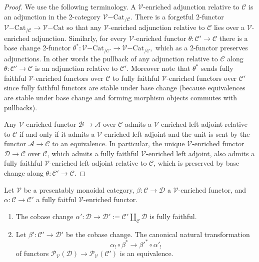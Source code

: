 \documentclass[10pt,oneside]{article}
\numberwithin{equation}{section} %
\numberwithin{figure}{section} %
\theoremstyle{plain}
\theoremstyle{definition}
\newcommand{\mA}{{\mathcal A}}
\newcommand{\mB}{{\mathcal B}}
\newcommand{\mC}{{\mathcal C}}
\newcommand{\mD}{{\mathcal D}}
\newcommand{\mP}{{\mathcal P}}
\newcommand{\mV}{{\mathcal V}}
\newcommand{\Cat}{\mathrm{Cat}}
\begin{document}
\begin{proof}

We use the following terminology.
A $\mV$-enriched adjunction relative to $\mC$ is an adjunction in the 2-category $ {\mV\mathrm{-}\Cat}_{/\mC}.$
There is a forgetful 2-functor $ {\mV\mathrm{-}\Cat}_{/\mC} \to {\mV\mathrm{-}\Cat}$ so that any $\mV$-enriched adjunction relative to $\mC$ lies over a $\mV$-enriched adjunction.
Similarly, for every $\mV$-enriched functor
$\theta: \mC' \to \mC$ there is a base change 2-functor $ \theta^*:{\mV\mathrm{-}\Cat}_{/\mC'} \to {\mV\mathrm{-}\Cat}_{/\mC},$ which as a 2-functor preserves adjunctions.
In other words the pullback of any adjunction relative to $\mC$ along $ \theta:\mC' \to \mC$ is an adjunction relative to $\mC'$. 
Moreover note that $\theta^*$ sends fully faithful $\mV$-enriched functors over $\mC$ to fully faithful $\mV$-enriched functors over $\mC'$ since fully faithful functors are stable under base change (because equivalences are stable under base change and forming morphism objects commutes with pullbacks).

Any $\mV$-enriched functor $\mB \to \mA$ over $\mC$ admits a $\mV$-enriched left adjoint relative to $\mC$ if and only if it admits a  $\mV$-enriched left adjoint and the unit is sent by the functor $\mA \to \mC$ to an equivalence. In particular, the unique $\mV$-enriched functor $\mD \to \mC$ over $\mC$, which admits a fully faithful $\mV$-enriched left adjoint, also admits a fully faithful $\mV$-enriched left adjoint relative to $\mC$,
which is preserved by base change along $\theta: \mC' \to \mC.$
\end{proof}

\begin{proposition}\label{fullyfaith}

Let $\mV$ be a presentably monoidal category,
$\beta: \mC \to \mD$ a $\mV$-enriched functor, and $\alpha: \mC \to \mC'$
a fully faitful $\mV$-enriched functor.
\begin{enumerate}[\normalfont(1)]\setlength{\itemsep}{-2pt}
\item The cobase change
$\alpha': \mD \to \mD' := \mC' \coprod_\mC \mD$ is fully faithful.
\item Let $\beta': \mC' \to \mD' $ be the cobase change.
The canonical natural transformation
$$ \alpha_! \circ \beta^* \to \beta'^* \circ \alpha'_! $$
of functors $\mP_\mV(\mD) \to \mP_\mV(\mC') $ is an equivalence.
\end{enumerate}   
\end{proposition}
\end{document}
